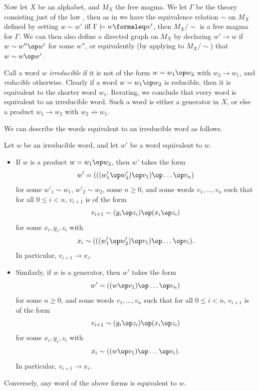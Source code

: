 Now let $X$ be an alphabet, and $M_X$ the free magma.  We let $\Gamma$ be the theory consisting just of the law , then as in  we have the equivalence relation $\sim$ on $M_X$ defined by setting $w \sim w'$ iff $\Gamma \models w \formaleq w'$, then $M_X/\sim$ is a free magma for $\Gamma$.  We can then also define a directed graph on $M_X$ by declaring $w' \to w$ if $w \sim w'' \op w'$ for some $w''$, or equivalently (by applying  to $M_X/\sim$) that $w \sim w \op w'$.

Call a word $w$ \emph{irreducible} if it is not of the form $w = w_1 \op w_2$ with $w_2 \to w_1$, and \emph{reducible} otherwise.  Clearly if a word $w = w_1 \op w_2$ is reducible, then it is equivalent to the shorter word $w_1$.  Iterating, we conclude that every word is equivalent to an irreducible word.  Such a word is either a generator in $X$, or else a product $w_1 \to w_2$ with $w_2 \not \to w_1$.

We can describe the words equivalent to an irreducible word as follows.

\begin{theorem}\label{irred-desc}  Let $w$ be an irreducible word, and let $w'$ be a word equivalent to $w$.
  \begin{itemize}
    \item[(i)] If $w$ is a product $w = w_1 \op w_2$, then $w'$ takes the form
$$ w' = (((w'_1 \op w'_2) \op v_1) \op \dots \op v_n)$$
for some $w'_1 \sim w_1$, $w'_2 \sim w_2$, some $n \geq 0$, and some words $v_1, \dots, v_n$ such that for all $0 \leq i < n$, $v_{i+1}$ is of the form
$$ v_{i+1} \sim (y_i \op z_i) \op (x_i \op z_i)$$
for some $x_i, y_i, z_i$ with
$$ x_i \sim (((w'_1 \op w'_2) \op v_1) \op \dots \op v_i).$$
In particular, $v_{i+1} \to x_i$.
    \item[(ii)] Similarly, if $w$ is a generator, then $w'$ takes the form
$$ w' = ((w \op v_1) \op \dots \op v_n)$$
for some $n \geq 0$, and some words $v_1, \dots, v_n$ such that for all $0 \leq i < n$, $v_{i+1}$ is of the form
$$ v_{i+1} \sim (y_i \op z_i) \op (x_i \op z_i)$$
for some $x_i, y_i, z_i$ with
$$ x_i \sim ((w \op v_1) \op \dots \op v_i).$$
In particular, $v_{i+1} \to x_i$.
\end{itemize}
Conversely, any word of the above forms is equivalent to $w$.
\end{theorem}

